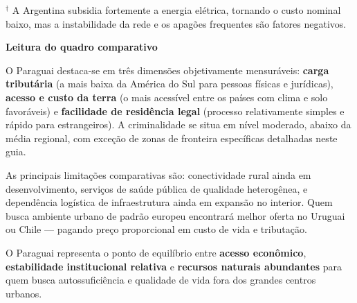 \vspace{0.3em}
{\small $^{\dagger}$ A Argentina subsidia fortemente a energia elétrica, tornando o custo nominal baixo, mas a instabilidade da rede e os apagões frequentes são fatores negativos.}

\vspace{0.8em}

\textbf{Leitura do quadro comparativo}

O Paraguai destaca-se em três dimensões objetivamente mensuráveis: \textbf{carga tributária} (a mais baixa da América do Sul para pessoas físicas e jurídicas), \textbf{acesso e custo da terra} (o mais acessível entre os países com clima e solo favoráveis) e \textbf{facilidade de residência legal} (processo relativamente simples e rápido para estrangeiros). A criminalidade se situa em nível moderado, abaixo da média regional, com exceção de zonas de fronteira específicas detalhadas neste guia.

As principais limitações comparativas são: conectividade rural ainda em desenvolvimento, serviços de saúde pública de qualidade heterogênea, e dependência logística de infraestrutura ainda em expansão no interior. Quem busca ambiente urbano de padrão europeu encontrará melhor oferta no Uruguai ou Chile — pagando preço proporcional em custo de vida e tributação.

\medskip
O Paraguai representa o ponto de equilíbrio entre \textbf{acesso econômico}, \textbf{estabilidade institucional relativa} e \textbf{recursos naturais abundantes} para quem busca autossuficiência e qualidade de vida fora dos grandes centros urbanos.
